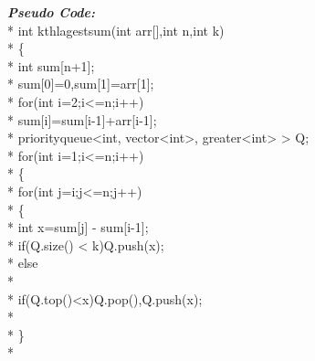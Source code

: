 \documentclass[12pt]{book}
\begin{document}
\textbf{\textit{Pseudo Code:}} \\*
int kthlagestsum(int arr[],int n,int k) \\*
\{ \\*
\phantom{x} \hspace{3ex}    int sum[n+1]; \\*
\phantom{x} \hspace{3ex}    sum[0]=0,sum[1]=arr[1];\\*
\phantom{x} \hspace{3ex}   for(int i=2;i<=n;i++) \\*
\phantom{x} \hspace{3ex}    sum[i]=sum[i-1]+arr[i-1];\\*
\phantom{x} \hspace{3ex}    priorityqueue<int, vector<int>, greater<int> > Q;\\*
\phantom{x} \hspace{3ex}    for(int i=1;i<=n;i++)\\*
\phantom{x} \hspace{3ex}    \{  \\*
\phantom{x} \hspace{3ex}\phantom{x} \hspace{3ex}        for(int j=i;j<=n;j++)  \\*
\phantom{x} \hspace{3ex}\phantom{x} \hspace{3ex}        \{ \\*
\phantom{x} \hspace{3ex}\phantom{x} \hspace{3ex}\phantom{x} \hspace{3ex}            int x=sum[j] - sum[i-1];\\*
\phantom{x} \hspace{3ex}\phantom{x} \hspace{3ex}\phantom{x} \hspace{3ex}            if(Q.size() < k)Q.push(x);\\*
\phantom{x} \hspace{3ex}\phantom{x} \hspace{3ex}\phantom{x} \hspace{3ex}            else\\*
\phantom{x} \hspace{3ex}\phantom{x} \hspace{3ex}\phantom{x} \hspace{3ex}            {\\*
\phantom{x} \hspace{3ex}\phantom{x} \hspace{3ex}\phantom{x} \hspace{3ex}\phantom{x} \hspace{3ex}                if(Q.top()<x)Q.pop(),Q.push(x);\\*
\phantom{x} \hspace{3ex}\phantom{x} \hspace{3ex}\phantom{x} \hspace{3ex}            }\\*
\phantom{x} \hspace{3ex}\phantom{x} \hspace{3ex}        \}\\*
\end{document}

